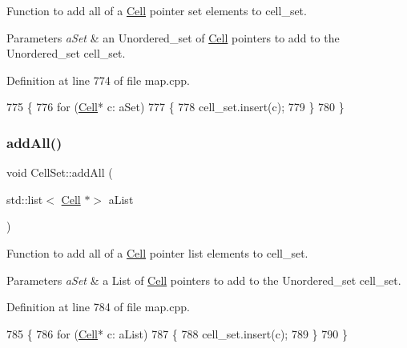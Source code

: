 Function to add all of a \hyperlink{class_cell}{Cell} pointer set elements to cell\+\_\+set. 


\begin{DoxyParams}{Parameters}
{\em a\+Set} & an Unordered\+\_\+set of \hyperlink{class_cell}{Cell} pointers to add to the Unordered\+\_\+set cell\+\_\+set. \\
\hline
\end{DoxyParams}


Definition at line 774 of file map.\+cpp.


\begin{DoxyCode}
775 \{
776     \textcolor{keywordflow}{for} (\hyperlink{class_cell}{Cell}* c: aSet)
777     \{
778         cell\_set.insert(c);
779     \}
780 \}
\end{DoxyCode}
\hypertarget{class_cell_set_a0d3c7fe4074fff58db2bf6932bf20ab0}{}\label{class_cell_set_a0d3c7fe4074fff58db2bf6932bf20ab0} 
\subsubsection{\texorpdfstring{add\+All()}{addAll()}\hspace{0.1cm}{\footnotesize\ttfamily [2/2]}}
{\footnotesize\ttfamily void Cell\+Set\+::add\+All (\begin{DoxyParamCaption}\item[{std\+::list$<$ \hyperlink{class_cell}{Cell} $\ast$$>$}]{a\+List }\end{DoxyParamCaption})}



Function to add all of a \hyperlink{class_cell}{Cell} pointer list elements to cell\+\_\+set. 


\begin{DoxyParams}{Parameters}
{\em a\+Set} & a List of \hyperlink{class_cell}{Cell} pointers to add to the Unordered\+\_\+set cell\+\_\+set. \\
\hline
\end{DoxyParams}


Definition at line 784 of file map.\+cpp.


\begin{DoxyCode}
785 \{
786     \textcolor{keywordflow}{for} (\hyperlink{class_cell}{Cell}* c: aList)
787     \{
788         cell\_set.insert(c);
789     \}
790 \}
\end{DoxyCode}
\hypertarget{class_cell_set_aaf42eb737301463a3ebf6a86c13a7dc4}{}\label{class_cell_set_aaf42eb737301463a3ebf6a86c13a7dc4} 
